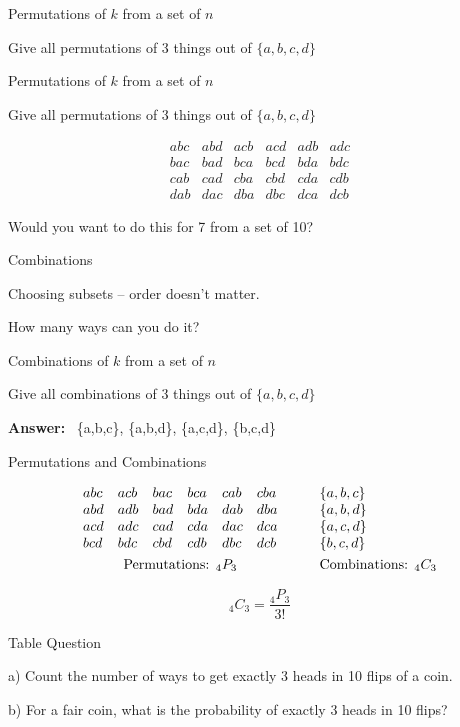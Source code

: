 \begin{frame}{Permutations of $k$ from a set of $n$}

{\Large
Give all permutations of 3 things out of $\{a,b,c,d\}$

}

\end{frame}

\begin{frame}{Permutations of $k$ from a set of $n$}

{\Large
Give all permutations of 3 things out of $\{a,b,c,d\}$
\bigskip

\[ \begin{array}{llllllllllllllll}
abc & abd & acb & acd & adb & adc \\
bac & bad & bca & bcd & bda & bdc \\
cab & cad & cba & cbd & cda & cdb \\
dab & dac & dba & dbc & dca & dcb
\end{array}
\]

\bigskip
 Would you want to do this for 7 from a set of 10?

}
\end{frame}

\begin{frame}{Combinations}

{\Large
Choosing subsets -- order doesn't matter. 

\bigskip

How many ways can you do it?
}
\end{frame}

\begin{frame}{Combinations of $k$ from a set of $n$}

{\Large
Give all combinations of 3 things out of $\{a,b,c,d\}$

\bigskip
\bigskip
\bigskip

\textbf{Answer:} \, \{a,b,c\}, \{a,b,d\}, \{a,c,d\}, \{b,c,d\}
}

\end{frame}

\begin{frame}{Permutations and Combinations}

{\Large
\[ \begin{array}{llllllllllllllll}
abc & acb & bac & bca & cab & cba & \quad & \{a,b,c\}\\
abd & adb & bad & bda & dab & dba & \quad & \{a,b,d\}\\
acd & adc & cad & cda & dac & dca & \quad & \{a,c,d\}\\
bcd & bdc & cbd & cdb & dbc & dcb & \quad & \{b,c,d\}\\[.8ex]
\multicolumn{6}{c}{\text{Permutations: }_4P_3} && 
\text{Combinations: }_4C_3
\end{array}
\]

\bigskip

\[_4C_3 = \frac{_4P_3}{3!}\]

}
\end{frame}

\begin{frame}{Table Question}

{\Large
a) Count the number of ways to get exactly 3 heads in 10 flips of a coin.

\bigskip

b) For a fair coin, what is the probability of exactly 3 heads in 10 flips?

}

\end{frame}


